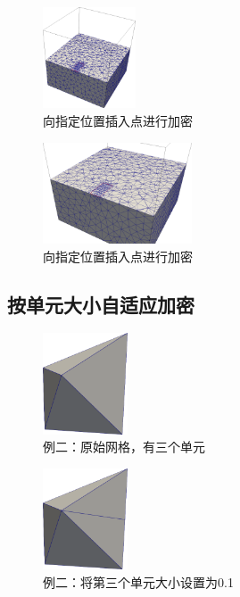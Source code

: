 \begin{figure}[!htbp]
  \centering
  \includegraphics[height=3cm]{fig/2/16.png}
  \caption{向指定位置插入点进行加密}
  \label{fig:2-1}
\end{figure}

\begin{figure}[!htbp]
  \centering
  \includegraphics[height=3cm]{fig/2/17.png}
  \caption{向指定位置插入点进行加密}
  \label{fig:2-1}
\end{figure}

\newpage
\subsection{按单元大小自适应加密}\label{se:2.1.2}

\begin{figure}[!htbp]
  \centering
  \includegraphics[height=3cm]{fig/2/7.png}
  \caption{例二：原始网格，有三个单元}
  \label{fig:2-1}
\end{figure}

\begin{figure}[!htbp]
  \centering
  \includegraphics[height=3cm]{fig/2/8.png}
  \caption{例二：将第三个单元大小设置为0.1}
  \label{fig:2-1}
\end{figure}

